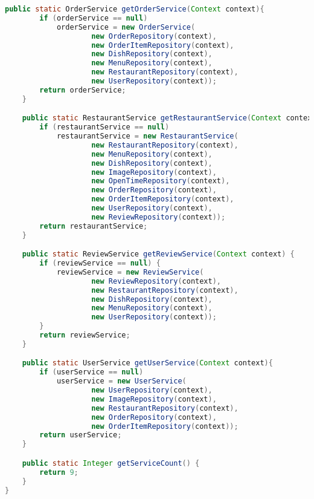\begin{lstlisting}[language=java,firstnumber=1]
    public static OrderService getOrderService(Context context){
        if (orderService == null)
            orderService = new OrderService(
                    new OrderRepository(context),
                    new OrderItemRepository(context),
                    new DishRepository(context),
                    new MenuRepository(context),
                    new RestaurantRepository(context),
                    new UserRepository(context));
        return orderService;
    }

    public static RestaurantService getRestaurantService(Context context){
        if (restaurantService == null)
            restaurantService = new RestaurantService(
                    new RestaurantRepository(context),
                    new MenuRepository(context),
                    new DishRepository(context),
                    new ImageRepository(context),
                    new OpenTimeRepository(context),
                    new OrderRepository(context),
                    new OrderItemRepository(context),
                    new UserRepository(context),
                    new ReviewRepository(context));
        return restaurantService;
    }

    public static ReviewService getReviewService(Context context) {
        if (reviewService == null) {
            reviewService = new ReviewService(
                    new ReviewRepository(context),
                    new RestaurantRepository(context),
                    new DishRepository(context),
                    new MenuRepository(context),
                    new UserRepository(context));
        }
        return reviewService;
    }

    public static UserService getUserService(Context context){
        if (userService == null)
            userService = new UserService(
                    new UserRepository(context),
                    new ImageRepository(context),
                    new RestaurantRepository(context),
                    new OrderRepository(context),
                    new OrderItemRepository(context));
        return userService;
    }

    public static Integer getServiceCount() {
        return 9;
    }
}
\end{lstlisting}